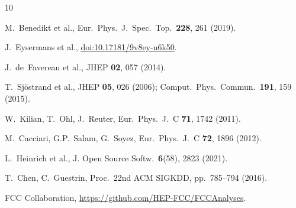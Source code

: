 \documentclass[a4paper,11pt]{article}
\begin{document}


\clearpage

\begingroup
\footnotesize
\setlength{\parskip}{0pt}
\setlength{\itemsep}{0pt plus 0.1ex}
\begin{thebibliography}{10}

M.~Benedikt et al., Eur.\ Phys.\ J.\ Spec.\ Top.\ \textbf{228}, 261 (2019).

J.~Eysermans et al., \href{https://doi.org/10.17181/9v8ey-n6k50}{doi:10.17181/9v8ey-n6k50}.

J.~de~Favereau et al., JHEP \textbf{02}, 057 (2014).

T.~Sj\"ostrand et al., JHEP \textbf{05}, 026 (2006); Comput.\ Phys.\ Commun.\ \textbf{191}, 159 (2015).

W.~Kilian, T.~Ohl, J.~Reuter, Eur.\ Phys.\ J.\ C \textbf{71}, 1742 (2011).

M.~Cacciari, G.P.~Salam, G.~Soyez, Eur.\ Phys.\ J.\ C \textbf{72}, 1896 (2012).

L.~Heinrich et al., J. Open Source Softw.\ \textbf{6}(58), 2823 (2021).

T.~Chen, C.~Guestrin, Proc.\ 22nd ACM SIGKDD, pp.\ 785--794 (2016).

FCC Collaboration, \url{https://github.com/HEP-FCC/FCCAnalyses}.

\end{thebibliography}
\endgroup
\end{document}
